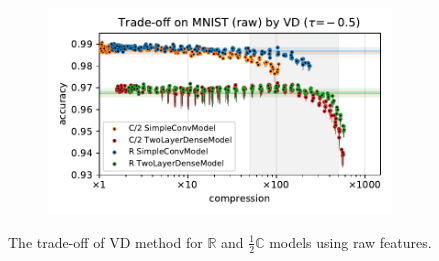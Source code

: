 \documentclass[a4paper,10pt,twocolumn]{article}
\newcommand{\real}{\mathbb{R}}
\newcommand{\cplx}{\mathbb{C}}
\begin{document}
\begin{figure}[b]
\begin{subfigure}[b]{0.5\columnwidth}
  \end{subfigure}%
  \begin{subfigure}[b]{0.5\columnwidth}
    \centering
    \includegraphics[width=\linewidth]{figure__mnist-like__trade-off/appendix__cmp__VD__mnist__raw__-0.5.pdf}
  \end{subfigure}
  \caption{%
    The trade-off of VD method for $\real$ and $\tfrac12\cplx$ models using raw features.
  }
  \label{fig:appendix__cmp__mnist-like__trade-off__VD__raw}
\end{figure}
\end{document}
